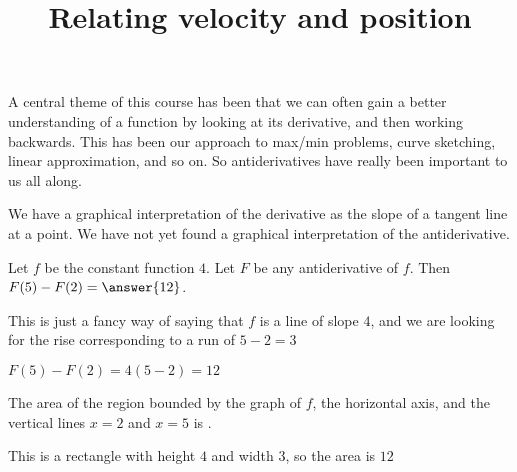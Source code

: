 \documentclass{ximera}
\title[Dig-In:]{Relating velocity and position}
\begin{document}
\begin{abstract}
\end{abstract}
\maketitle

A central theme of this course has been that we can often gain a
better understanding of a function by looking at its derivative, and
then working backwards.  This has been our approach to max/min
problems, curve sketching, linear approximation, and so on.  So
antiderivatives have really been important to us all along.

We have a graphical interpretation of the derivative as the slope of a
tangent line at a point.  We have not yet found a graphical
interpretation of the antiderivative.

  \begin{question}
   Let $f$ be the constant function $4$. Let $F$ be any antiderivative
   of $f$.  Then $F(5)-F(2) = \answer{12}$.
   \begin{hint}
    This is just a fancy way of saying that $f$ is a line of slope
    $4$, and we are looking for the rise corresponding to a run of
    $5-2= 3$
   \end{hint}
   \begin{hint}
    $F(5) - F(2) = 4(5-2) = 12$
   \end{hint}
  \end{question}
  
  \begin{question}
    The area of the region bounded by the graph of $f$, the horizontal
    axis, and the vertical lines $x=2$ and $x=5$ is .
    
    \begin{hint}
      \begin{image}
\end{image}
    \end{hint}
    \begin{hint}
      This is a rectangle with height $4$ and width $3$, so the area is $12$
    \end{hint}
  \end{question}
\end{document}
